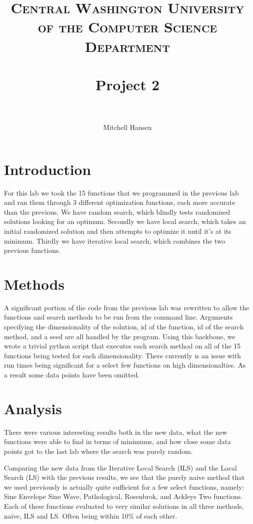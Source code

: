 \documentclass[paper=a4, fontsize=11pt]{scrartcl}
\title{
		\usefont{OT1}{bch}{b}{n}
		\normalfont \normalsize \textsc{Central Washington University of the Computer Science Department} \\ [25pt]
		\horrule{0.5pt} \\[0.4cm]
		\huge Project 2 \\
		\horrule{2pt} \\[0.5cm]
}
\author{\normalsize Mitchell Hansen \\[-6pt]}
\numberwithin{equation}{section}
\numberwithin{figure}{section}
\numberwithin{table}{section}
\begin{document}
\maketitle

\section{Introduction}
For this lab we took the 15 functions that we programmed in the previous
lab and ran them through 3 different optimization functions, each more
accurate than the previous. We have random search, which blindly tests
randomized solutions looking for an optimum. Secondly we have local search,
which takes an initial randomized solution and then attempts to optimize it
until it's at its minimum. Thirdly we have iterative local search, which
combines the two previous functions.

\section{Methods}
A significant portion of the code from the previous lab was rewritten to
allow the functions and search methods to be run from the command line.
Arguments specifying the dimensionality of the solution, id of the function,
id of the search method, and a seed are all handled by the program. Using
this backbone, we wrote a trivial python script that executes each search
method on all of the 15 functions being tested for each dimensionality.
There currently is an issue with run times being significant for a select
few functions on high dimensionalties. As a result some data points have
been omitted.

\section{Analysis}
There were various interesting results both in the new data, what the new
functions were able to find in terms of minimums, and how close some data
points got to the last lab where the search was purely random.

Comparing the new data from the Iterative Local Search (ILS) and the Local
Search (LS) with the previous results, we see that the purely naive method
that we used previously is actually quite sufficient for a few select functions,
namely: Sine Envelope Sine Wave, Pathological, Rosenbrok, and Ackleys
Two functions. Each of these functions evaluated to very similar solutions
in all three methods, naive, ILS and LS. Often being within 10\% of each other.
\end{document}

